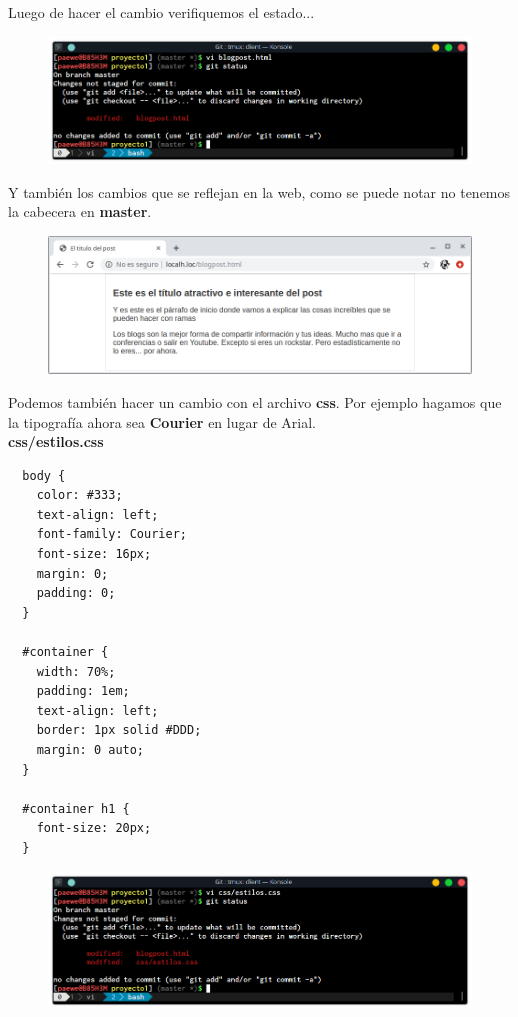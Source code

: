 \documentclass{article}
\begin{document}
Luego de hacer el cambio verifiquemos el estado...

\begin{figure}[h!]
  \centering
  \includegraphics[scale=0.75]{./Pictures/152_master_konsole.png}
\end{figure}

Y también los cambios que se reflejan en la web, como se puede notar no tenemos
la cabecera en \textbf{master}.

\begin{figure}[h!]
  \centering
  \includegraphics[scale=0.75]{./Pictures/151_master_web.png}
\end{figure}

Podemos también hacer un cambio con el archivo \textbf{css}. Por ejemplo
hagamos que la tipografía ahora sea \textbf{Courier} en lugar de Arial.\\

\textbf{css/estilos.css}
\begin{verbatim}
  body {
    color: #333;
    text-align: left;
    font-family: Courier;
    font-size: 16px;
    margin: 0;
    padding: 0;
  }

  #container {
    width: 70%;
    padding: 1em;
    text-align: left;
    border: 1px solid #DDD;
    margin: 0 auto;
  }

  #container h1 {
    font-size: 20px;
  }
\end{verbatim}

\begin{figure}[h!]
  \centering
  \includegraphics[scale=0.75]{./Pictures/153_tipografia.png}
\end{figure}
\end{document}
